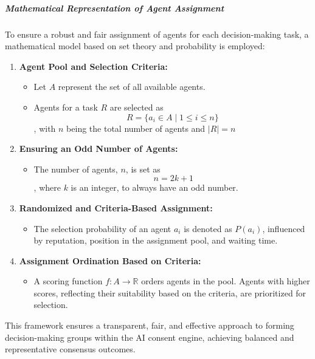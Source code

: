 \documentclass{article}
\begin{document}
\hypertarget{mathematical-representation-of-agent-assignment}{%
\subparagraph{Mathematical Representation of Agent
Assignment}\label{mathematical-representation-of-agent-assignment}}

To ensure a robust and fair assignment of agents for each
decision-making task, a mathematical model based on set theory and
probability is employed:

\begin{enumerate}
\def\labelenumi{\arabic{enumi}.}
\item
  \textbf{Agent Pool and Selection Criteria:}

  \begin{itemize}
  \item
    Let \( A \) represent the set of all available agents.
  \item
    Agents for a task \( R \) are selected as
    \[ R = \{ a_i \in A \mid 1 \leq i \leq n \} \], with \( n \)
    being the total number of agents and \( |R| = n \)
  \end{itemize}
\item
  \textbf{Ensuring an Odd Number of Agents:}

  \begin{itemize}
  \item
    The number of agents, \( n \), is set as \[\ n = 2k + 1 \],
    where \( k \) is an integer, to always have an odd number.
  \end{itemize}
\item
  \textbf{Randomized and Criteria-Based Assignment:}

  \begin{itemize}
  \item
    The selection probability of an agent \( a_i \) is denoted as
    \( P(a_i) \), influenced by reputation, position in the
    assignment pool, and waiting time.
  \end{itemize}
\item
  \textbf{Assignment Ordination Based on Criteria:}

  \begin{itemize}
  \item
    A scoring function \( f: A \rightarrow \mathbb{R} \) orders
    agents in the pool. Agents with higher scores, reflecting their
    suitability based on the criteria, are prioritized for selection.
  \end{itemize}
\end{enumerate}

This framework ensures a transparent, fair, and effective approach to
forming decision-making groups within the AI consent engine, achieving
balanced and representative consensus outcomes.
\end{document}
